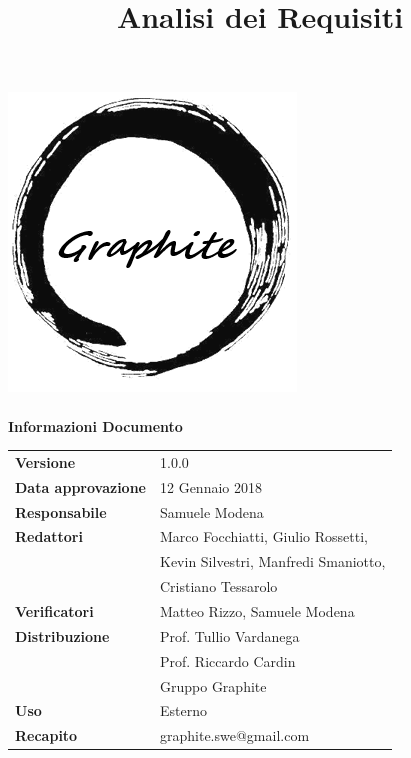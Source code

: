 \label{key}\documentclass[openany,12pt,a4paper]{report}
\title{Analisi dei Requisiti}
\author{}
\newcommand{\versione}{1.0.0}
\begin{document}
	
	\makeatletter
	\begin{titlepage}
		\setlength{\headsep}{0pt}  
		\begin{center}			
			\includegraphics[width=0.5\linewidth]{Logo.png}\\[1em]
			{\huge \bfseries  \@title }\\[10ex]
			\textbf{\Large Informazioni Documento} \\[2em]
			\bgroup
			\def\arraystretch{1.5}
			\begin{tabular}{l|l}
				\textbf{Versione} & \versione{} \\
				\textbf{Data approvazione} & 12 Gennaio 2018 \\
				\textbf{Responsabile} & Samuele Modena \\
				\textbf{Redattori} & Marco Focchiatti, Giulio Rossetti,\\
				& Kevin Silvestri, Manfredi Smaniotto,\\
				& Cristiano Tessarolo \\
				\textbf{Verificatori} & Matteo Rizzo, Samuele Modena \\
				\textbf{Distribuzione} & Prof. Tullio Vardanega \\
				 & Prof. Riccardo Cardin \\
				 & Gruppo Graphite \\
				\textbf{Uso} & Esterno \\
				\textbf{Recapito} & graphite.swe@gmail.com \\
			\end{tabular}
		\egroup
		\end{center}
	\end{titlepage}
	\makeatother

	\thispagestyle{empty}
	\newpage
	
	
	
	\tableofcontents
	\listoffigures
	\listoftables
	
	
	
	
	
	
	
\end{document}
